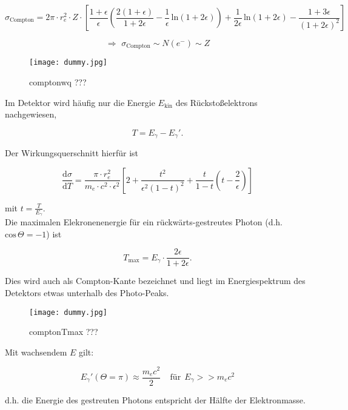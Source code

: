 \[\sigma_{\text{Compton}} = 2\pi \cdot r_e^2\cdot Z \cdot
\left[\frac{1+\epsilon}{\epsilon}\left( \frac{2(1+\epsilon)}{1+2\epsilon} -
\frac{1}{\epsilon}\,\text{ln}(1+2\epsilon) \right) + \frac{1}{2\epsilon}\,\text{ln}(1+2\epsilon) -
\frac{1+3\epsilon}{(1+2\epsilon)^2} \right] \]

\[\Rightarrow\,\, \sigma_{\text{Compton}} \sim N(e^-) \sim Z  \]

\begin{figure}[H]
	\centering
	\texttt{[image: dummy.jpg]}
	\caption{	comptonwq ???}
	\label{comptonwq}
\end{figure}

Im Detektor wird häufig nur die Energie $E_{\text{kin}}$ des Rückstoßelektrons nachgewiesen,

\[T= E_\gamma -E_\gamma'.  \]

Der Wirkungsquerschnitt hierfür ist

\[\frac{\mathrm{d}\sigma}{\mathrm{d}T} = \frac{\pi\cdot r_e^2}{m_e\cdot c^2\cdot \epsilon^2} \left[
2+ \frac{t^2}{\epsilon^2(1-t)^2} +\frac{t}{1-t}\left(t-\frac{2}{\epsilon} \right) \right] \]

mit $t=\frac{T}{E_\gamma}$.
\\
Die maximalen Elekronenenergie für ein rückwärts-gestreutes Photon (d.h. $\text{cos}\,\Theta=-1$)
ist

\[T_{\text{max}} = E_\gamma\cdot \frac{2\epsilon}{1+2\epsilon}. \] 

Dies wird auch als Compton-Kante bezeichnet und liegt im Energiespektrum des Detektors etwas
unterhalb des Photo-Peaks.

\begin{figure}[H]
	\centering
	\texttt{[image: dummy.jpg]}
	\caption{	comptonTmax ???}
	\label{comptonTmax}
\end{figure}

Mit wachsendem $E$ gilt:

\[E_\gamma'(\Theta=\pi) \approx \frac{m_ec^2}{2}~~~~~\text{für}~~E_\gamma>>m_ec^2  \]

d.h. die Energie des gestreuten Photons entspricht der Hälfte der Elektronmasse.